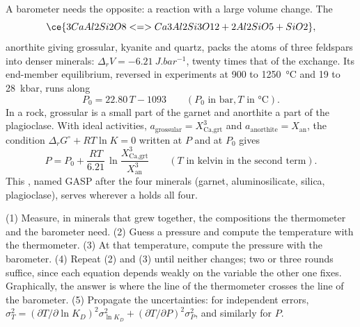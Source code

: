 A barometer needs the opposite: a reaction with a large volume change. The 
\[
\ce{3 CaAl2Si2O8 <=> Ca3Al2Si3O12 + 2 Al2SiO5 + SiO2},
\]
anorthite giving grossular, kyanite and quartz, packs the atoms of three feldspars into
denser minerals: $\Delta_r V = \qty{-6.21}{J.bar^{-1}}$, twenty times that of the exchange.
Its end-member equilibrium, reversed in experiments at 900 to \qty{1250}{\celsius} and 19
to \qty{28}{kbar}, runs along
\[
P_0 = 22.80\,T - 1093 \qquad (P_0 \text{ in bar}, T \text{ in } \unit{\celsius}).
\]
In a rock, grossular is a small part of the garnet and anorthite a part of the
plagioclase. With ideal activities, $a_{\text{grossular}} = X_{\text{Ca,grt}}^3$ and
$a_{\text{anorthite}} = X_{\text{an}}$, the condition $\Delta_r G^\circ + RT\ln K = 0$
written at $P$ and at $P_0$ gives
\[
P = P_0 + \frac{RT}{6.21}\,\ln\frac{X_{\text{Ca,grt}}^3}{X_{\text{an}}^3}
\qquad (T \text{ in kelvin in the second term}).
\]
This , named GASP after the four minerals (garnet, aluminosilicate, silica,
plagioclase), serves wherever a  holds all four.

\begin{method}\label{met:b2:pt-paths:intersection}
(1) Measure, in minerals that grew together, the compositions the thermometer and the
barometer need. (2) Guess a pressure and compute the temperature with the thermometer.
(3) At that temperature, compute the pressure with the barometer. (4) Repeat (2) and (3)
until neither changes; two or three rounds suffice, since each equation depends weakly on
the variable the other one fixes. Graphically, the answer is where the line of the
thermometer crosses the line of the barometer. (5) Propagate the uncertainties: for
independent errors, $\sigma_T^2 = (\partial T/\partial\ln K_D)^2\sigma_{\ln K_D}^2 +
(\partial T/\partial P)^2\sigma_P^2$, and similarly for $P$.
\end{method}

